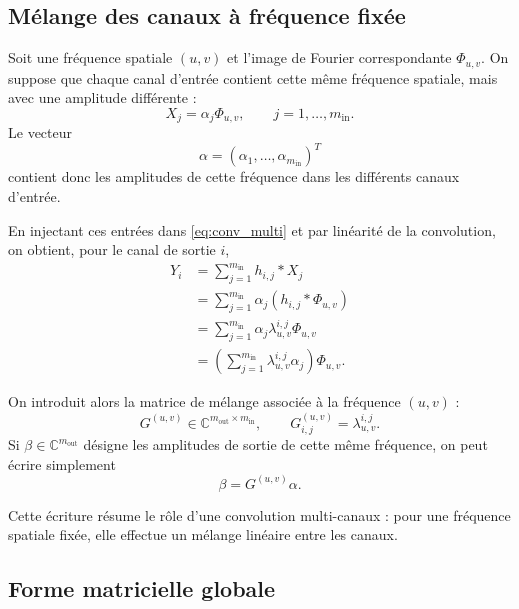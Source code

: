 

\subsection{Mélange des canaux à fréquence fixée}
\label{subsec:melange_canaux_frequence_fixee}

Soit une fréquence spatiale $(u,v)$ et l'image de Fourier correspondante $\Phi_{u,v}$.
On suppose que chaque canal d'entrée contient cette même fréquence spatiale, mais avec une amplitude
différente :
\[
    X_j = \alpha_j \Phi_{u,v},
    \qquad j=1,\dots,m_{\mathrm{in}}.
\]
Le vecteur
\[
    \alpha = (\alpha_1,\dots,\alpha_{m_{\mathrm{in}}})^T
\]
contient donc les amplitudes de cette fréquence dans les différents canaux d'entrée.

En injectant ces entrées dans \eqref{eq:conv_multi} et par linéarité de la convolution, on obtient, pour le canal de sortie $i$,
\begin{align*}
Y_i
&=
\sum_{j=1}^{m_{\mathrm{in}}} h_{i,j} * X_j \\
&=
\sum_{j=1}^{m_{\mathrm{in}}} \alpha_j (h_{i,j} * \Phi_{u,v}) \\
&=
\sum_{j=1}^{m_{\mathrm{in}}} \alpha_j \lambda^{i,j}_{u,v}\Phi_{u,v} \\
&=
\left(
    \sum_{j=1}^{m_{\mathrm{in}}}
    \lambda^{i,j}_{u,v}\alpha_j
\right)
\Phi_{u,v}.
\end{align*}

On introduit alors la matrice de mélange associée à la fréquence $(u,v)$ :
\[
    G^{(u,v)} \in \mathbb{C}^{m_{\mathrm{out}}\times m_{\mathrm{in}}},
    \qquad
    G^{(u,v)}_{i,j}
    =
    \lambda^{i,j}_{u,v}.
\]
Si $\beta\in\mathbb{C}^{m_{\mathrm{out}}}$ désigne les amplitudes de sortie de cette même fréquence,
on peut écrire simplement
\[
    \beta = G^{(u,v)}\alpha.
\]

Cette écriture résume le rôle d'une convolution multi-canaux : pour une fréquence spatiale fixée,
elle effectue un mélange linéaire entre les canaux. 

\subsection{Forme matricielle globale}

